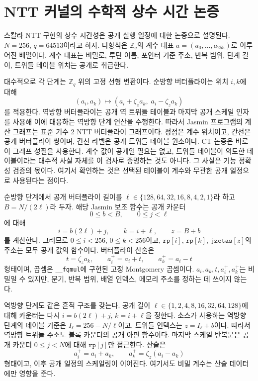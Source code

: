 \documentclass[10pt,twocolumn]{article}
\newcommand{\jasmin}{Jasmin}
\newcommand{\Zq}{\mathbb{Z}_q}
\begin{document}
\section{NTT 커널의 수학적 상수 시간 논증}

스칼라 NTT 구현의 상수 시간성은 공개 실행 일정에 대한 논증으로 설명된다.
\(N=256\), \(q=64513\)이라고 하자. 다항식은 \(\Zq\)의 계수 대표
\(a=(a_0,\ldots,a_{255})\)로 이루어진 배열이다. 계수 대표는 비밀로,
루틴 이름, 포인터 기준 주소, 반복 범위, 단계 길이, 트위들 테이블 위치는
공개로 취급한다.

대수적으로 각 단계는 \(\Zq\) 위의 고정 선형 변환이다. 순방향 버터플라이는
위치 \(i,k\)에 대해
\[
  (a_i,a_k)\longmapsto (a_i+\zeta_z a_k,\; a_i-\zeta_z a_k)
\]
를 적용한다. 역방향 버터플라이는 공개 역 트위들 테이블과 마지막 공개
스케일 인자를 사용해 이에 대응하는 역방향 단계 연산을 수행한다. 따라서
\jasmin{} 프로그램의 계산 그래프는 표준 기수 2 NTT 버터플라이 그래프이다.
정점은 계수 위치이고, 간선은 공개 버터플라이 쌍이며, 간선 라벨은 공개
트위들 테이블 원소이다. CT 논증은 바로 이 그래프 성질을 사용한다. 계수
값이 공개일 필요는 없고, 트위들 테이블이 의도한 테이블이라는 대수적
사실 자체를 이 검사로 증명하는 것도 아니다. 그 사실은 기능 정확성 검증의
몫이다. 여기서 확인하는 것은 선택된 테이블이 계수와 무관한 공개 일정으로
사용된다는 점이다.

순방향 단계에서 공개 버터플라이 길이를
\(\ell\in\{128,64,32,16,8,4,2,1\}\)라 하고 \(B=N/(2\ell)\)라 두자.
해당 \jasmin{} 보조 함수는 공개 카운터
\[
  0\le b < B,\qquad 0\le j < \ell
\]
에 대해
\[
  i=b(2\ell)+j,\qquad k=i+\ell,\qquad z=B+b
\]
를 계산한다. 그러므로 \(0\le i<256\), \(0\le k<256\)이고,
\(\texttt{rp}[i]\), \(\texttt{rp}[k]\), \(\texttt{jzetas}[z]\)의 주소는 모두
공개 값의 함수이다. 버터플라이 산술은
\[
  t=\zeta_z a_k,\qquad a_i^{+}=a_i+t,\qquad a_k^{+}=a_i-t
\]
형태이며, 곱셈은 \texttt{\_\_fqmul}에 구현된 고정 Montgomery 곱셈이다.
\(a_i,a_k,t,a_i^{+},a_k^{+}\)는 비밀일 수 있지만, 분기, 반복 범위, 배열
인덱스, 메모리 주소를 정하는 데 쓰이지 않는다.

역방향 단계도 같은 흔적 구조를 갖는다. 공개 길이
\(\ell\in\{1,2,4,8,16,32,64,128\}\)에 대해 카운터는 다시
\(i=b(2\ell)+j\), \(k=i+\ell\)을 정한다. 소스가 사용하는 역방향 단계의
테이블 기준은 \(I_\ell=256-N/\ell\)이고, 트위들 인덱스는 \(z=I_\ell+b\)이다.
따라서 역방향 트위들 주소도 블록 카운터의 공개 아핀 함수이다. 마지막
스케일 반복문은 공개 카운터 \(0\le j<N\)에 대해 \(\texttt{rp}[j]\)만
접근한다. 산술은
\[
  a_i^{+}=a_i+a_k,\qquad a_k^{+}=\zeta_z(a_i-a_k)
\]
형태이고, 이후 공개 일정의 스케일링이 이어진다. 여기서도 비밀 계수는
산술 데이터에만 영향을 준다.
\end{document}
